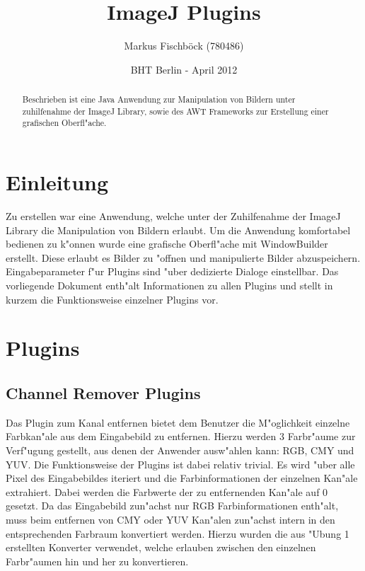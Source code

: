 \documentclass[a4paper]{article}
\title{ImageJ Plugins}
\author{Markus Fischb\"ock (780486)}
\date{BHT Berlin - April 2012}
\begin{document}
\maketitle
\begin{abstract}
Beschrieben ist eine Java Anwendung zur Manipulation von Bildern unter zuhilfenahme der ImageJ Library, sowie
des AWT Frameworks zur Erstellung einer grafischen Oberfl"ache.

\end{abstract}


\newpage
\tableofcontents
\newpage

\section{Einleitung}
Zu erstellen war eine Anwendung, welche unter der Zuhilfenahme der ImageJ Library die Manipulation von Bildern erlaubt. Um die Anwendung komfortabel bedienen zu k"onnen wurde eine grafische Oberfl"ache mit WindowBuilder erstellt. Diese erlaubt es Bilder zu "offnen und manipulierte Bilder abzuspeichern. Eingabeparameter f"ur Plugins sind "uber dedizierte Dialoge einstellbar. Das vorliegende Dokument enth"alt Informationen zu allen Plugins und stellt in kurzem die Funktionsweise einzelner Plugins vor.

\section{Plugins}
\subsection{Channel Remover Plugins}
Das Plugin zum Kanal entfernen bietet dem Benutzer die M"oglichkeit einzelne Farbkan"ale aus dem Eingabebild zu entfernen. Hierzu werden 3 Farbr"aume zur Verf"ugung gestellt, aus denen der Anwender ausw"ahlen kann: RGB, CMY und YUV. Die Funktionsweise der Plugins ist dabei relativ trivial. Es wird "uber alle Pixel des Eingabebildes iteriert und die Farbinformationen der einzelnen Kan"ale extrahiert. Dabei werden die Farbwerte der zu entfernenden Kan"ale auf 0 gesetzt.
Da das Eingabebild zun"achst nur RGB Farbinformationen enth"alt, muss beim entfernen von CMY oder YUV Kan"alen zun"achst intern in den entsprechenden Farbraum konvertiert werden. Hierzu wurden die aus "Ubung 1 erstellten Konverter verwendet, welche erlauben zwischen den einzelnen Farbr"aumen hin und her zu konvertieren. 
\end{document}
